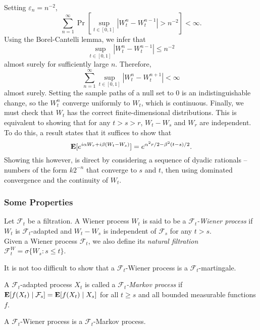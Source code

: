 	Setting $\varepsilon_n = n^{-2}$,
	\[ \sum_{n=1}^\infty \Pr\left[\sup_{t\in[0,1]} |W_t^n - W_t^{n-1}| > n^{-2} \right] < \infty. \]
	Using the Borel-Cantelli lemma, we infer that
	\[ \sup_{t\in[0,1]} |W_t^n - W_t^{n-1}| \leq n^{-2} \]
	almost surely for sufficiently large $n$. Therefore,
	\[ \sum_{n=1}^\infty \sup_{t\in[0,1]} |W_t^n - W_t^{n+1}| < \infty \]
	almost surely. Setting the sample paths of a null set to $0$ is an indistinguishable change, so the $W_t^n$ converge uniformly to $W_t$, which is continuous. Finally, we must check that $W_t$ has the correct finite-dimensional distributions. This is equivalent to showing that for any $t>s>r$, $W_t-W_s$ and $W_r$ are independent.\\
	To do this, a result states that it suffices to show that
	\[ \textbf{E}[e^{i\alpha W_r + i\beta(W_t-W_s)}] = e^{\alpha^2r/2 - \beta^2(t-s)/2}. \]
	Showing this however, is direct by considering a sequence of dyadic rationals -- numbers of the form $k2^{-n}$ that converge to $s$ and $t$, then using dominated convergence and the continuity of $W_t$.

	\subsubsection{Some Properties}

	\begin{definition}
		Let $\mathcal{F}_t$ be a filtration. A Wiener process $W_t$ is said to be a \textit{$\mathcal{F}_t$-Wiener process} if $W_t$ is $\mathcal{F}_t$-adapted and $W_t-W_s$ is independent of $\mathcal{F}_s$ for any $t>s$.\\
		Given a Wiener process $\mathcal{F}_t$, we also define its \textit{natural filtration} $\mathcal{F}_t^W = \sigma\{W_s : s\leq t\}$.
	\end{definition}

	It is not too difficult to show that a $\mathcal{F}_t$-Wiener process is a $\mathcal{F}_t$-martingale.

	\begin{definition}
		A $\mathcal{F}_t$-adapted process $X_t$ is called a \textit{$\mathcal{F}_t$-Markov process} if $\textbf{E}[f(X_t)\mid\mathcal{F}_s] = \textbf{E}[f(X_t)\mid X_s]$ for all $t\geq s$ and all bounded measurable functions $f$.
	\end{definition}

	\begin{lemma}
		A $\mathcal{F}_t$-Wiener process is a $\mathcal{F}_t$-Markov process.
	\end{lemma}

